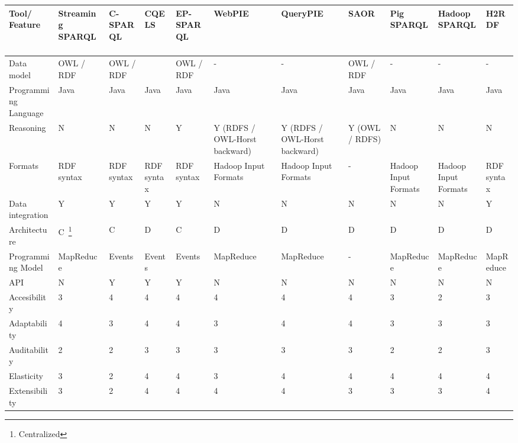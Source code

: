 \begin{sidewaystable}[!ht]
\renewcommand{\arraystretch}{1.3}
\tiny
\begin{center}
\begin{tabular}[c]{|p{1.7cm}|p{1.5cm}|p{1.5cm}|p{1.5cm}|p{1.5cm}|p{1.5cm}|p{1.5cm}|p{1.5cm}|p{1.5cm}|p{1.5cm}|p{1.5cm}|} 
\hline
 \textbf{Tool/ Feature}  &  Streaming SPARQL~\cite{Bolles:2008:SSE:1789394.1789438} & C-SPARQL~\cite{Barbieri:2010:EEC:1739041.1739095} & CQELS~\cite{deri2010} & EP-SPARQL~\cite{Anicic:2011:EUL:1963405.1963495} & WebPIE~\cite{DBLP:journals/ws/UrbaniKMHB12} & QueryPIE~\cite{Urbani:2011:QBR:2063016.2063063} & SAOR~\cite{DBLP:journals/ijswis/HoganHP09} & Pig SPARQL~\cite{Schatzle:2011:PMS:1999299.1999303}& Hadoop SPARQL~\cite{liuhadoopsparql} & H2RDF~\cite{Papailiou:2012:HAQ:2187980.2188058}   \\ \hline
  Data model & OWL / RDF & OWL / RDF   &  & OWL / RDF & - & - &  OWL / RDF & - & - & -\\ \hline  
  Programming Language & Java & Java  & Java & Java & Java &  Java & Java &  Java &  Java & Java \\ \hline  
  Reasoning & N & N  & N & Y & Y (RDFS / OWL-Horst backward) & Y (RDFS / OWL-Horst backward) & Y (OWL / RDFS) & N & N & N \\ \hline  
  Formats & RDF syntax & RDF syntax  &RDF syntax  & RDF syntax & Hadoop Input Formats & Hadoop Input Formats & - & Hadoop Input Formats & Hadoop Input Formats & RDF syntax\\ \hline  
  Data integration & Y & Y & Y & Y &  N & N & N & N & N & Y\\ \hline  
  Architecture & C~\footnote{Centralized} & C  &  D& C & D & D & D & D & D & D\\ \hline  
  Programming Model & MapReduce & Events  & Events & Events &  MapReduce &  MapReduce & - & MapReduce & MapReduce & MapReduce\\ \hline  
  API & N & Y  & Y & Y & N & N & N & N & N & N \\ \hline  
  Accesibility & 3 & 4  & 4  & 4 & 4 & 4 & 4 & 3 & 2 & 3\\ \hline  
  Adaptability & 4 & 3  & 4 & 4 & 3 & 4 & 4 & 3 & 3 & 3\\ \hline  
  Auditability & 2 & 2  & 3 & 3 & 3 & 3 & 3 & 2 & 2 & 3\\ \hline  
  Elasticity & 3 & 2  & 4 & 4 & 3 & 4 & 4 & 4 & 4 & 4\\ \hline  
  Extensibility & 3 & 2  & 4 & 4 & 4 & 4 & 3 & 3 & 3 &4 \\ \hline  

\end{tabular}
\end{center}
\end{sidewaystable}
